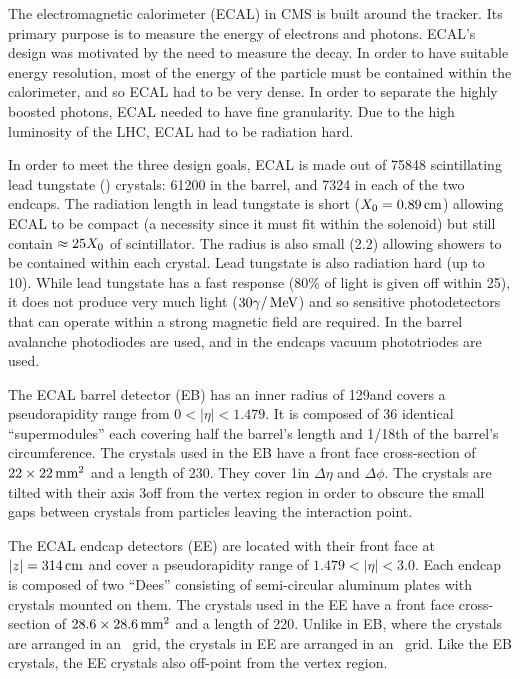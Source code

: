 The electromagnetic calorimeter (ECAL) in CMS is built around the tracker. Its
primary purpose is to measure the energy of electrons and photons. ECAL's
design was motivated by the need to measure the \higgstogammagamma decay. In
order to have suitable energy resolution, most of the energy of the particle
must be contained within the calorimeter, and so ECAL had to be very dense. In
order to separate the highly boosted photons, ECAL needed to have fine
granularity. Due to the high luminosity of the LHC, ECAL had to be radiation
hard.

In order to meet the three design goals, ECAL is made out of 75848
scintillating lead tungstate (\leadtungstate) crystals: 61200 in the barrel,
and 7324 in each of the two endcaps. The radiation length in lead tungstate is
short ($X_{0} = 0.89\text{\,cm}$) allowing ECAL to be compact (a
necessity since it must fit within the solenoid) but still contain $\approx
25X_{0}$ of scintillator. The \Moliere radius is also small
(2.2\centimeters) allowing showers to be contained within each crystal. Lead
tungstate is also radiation hard (up to 10\megarads). While lead tungstate has
a fast response (80\% of light is given off within 25\ns), it does not produce
very much light ($30 \gamma / \,\text{Me\hspace{-.08em}V}$) and so sensitive photodetectors that can
operate within a strong magnetic field are required. In the barrel avalanche
photodiodes are used, and in the endcaps vacuum phototriodes are used.

The ECAL barrel detector (EB) has an inner radius of 129\centimeters and covers
a pseudorapidity range from $0 < |\eta| < 1.479$. It is composed of 36
identical ``supermodules'' each covering half the barrel's length and 1/18th of
the barrel's circumference. The crystals used in the EB have a front face
cross-section of $22 \times 22\text{\,mm}^{2}$ and a length of
230\millimeters. They cover 1\degrees in $\Delta \eta$ and $\Delta \phi$. The
crystals are tilted with their axis 3\degrees off from the vertex region in
order to obscure the small gaps between crystals from particles leaving the
interaction point.

The ECAL endcap detectors (EE) are located with their front face at
$|z|=314\text{\,cm}$ and cover a pseudorapidity range of $1.479 < |\eta| <
3.0$. Each endcap is composed of two ``Dees'' consisting of semi-circular
aluminum plates with crystals mounted on them. The crystals used in the EE have
a front face cross-section of $28.6 \times 28.6\text{\,mm}^{2}$ and a length
of 220\millimeters. Unlike in EB, where the crystals are arranged in an
\coordetaphi~grid, the crystals in EE are arranged in an \coordxy~grid. Like
the EB crystals, the EE crystals also off-point from the vertex region.

